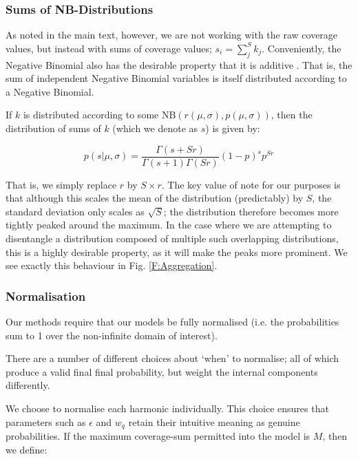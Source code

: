 \documentclass[fleqn,usenatbib]{mnras}
\begin{document}
{					

				\subsubsection{Sums of NB-Distributions}\label{A:Sums}
					As noted in the main text, however, we are not working with the raw coverage values, but instead with sums of coverage values; $s_i = \sum_j^S k_j$. Conveniently, the Negative Binomial also has the desirable property that it is additive \citep{RHBMaths}. That is, the sum of independent Negative Binomial variables is itself distributed according to a Negative Binomial. 

					If $k$ is distributed according to some $\text{NB}(r(\mu,\sigma), p(\mu,\sigma))$, then the distribution of sums of $k$ (which we denote as $s$) is given by:
					
					\begin{equation}
						p(s| \mu,\sigma) = \frac{\Gamma(s + Sr)}{\Gamma(s+1) \Gamma(Sr)} (1 - p)^s p^{Sr}
					\end{equation}

					That is, we simply replace $r$ by $S \times r$. The key value of note for our purposes is that although this scales the mean of the distribution (predictably) by $S$, the standard deviation only scales as $\sqrt{S}$; the distribution therefore becomes more tightly peaked around the maximum. In the case where we are attempting to disentangle a distribution composed of multiple such overlapping distributions, this is a highly desirable property, as it will make the peaks more prominent. We see exactly this behaviour in Fig. \ref{F:Aggregation}.

					\subsubsection{Normalisation}

						Our methods require that our models be fully normalised (i.e. the probabilities sum to 1 over the non-infinite domain of interest). 

						There are a number of different choices about `when' to normalise; all of which produce a valid final final probability, but weight the internal components differently. 

						We choose to normalise each harmonic individually. This choice ensures that parameters such as $\epsilon$ and $w_q$ retain their intuitive meaning as genuine probabilities. If the maximum coverage-sum permitted into the model is $M$, then we define:

}
\end{document}
